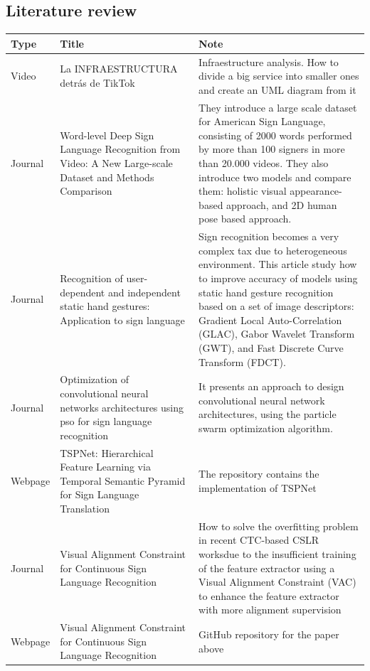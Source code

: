 \subsection{Literature review}
\begin{longtable}{|p{3cm}|p{4cm}|p{6cm}|}
    \hline {Type} & {Title} & {Note}      \\
    \hline Video & La INFRAESTRUCTURA detrás de TikTok \cite{TikTok2021} & Infraestructure analysis. How to divide a big service into smaller ones and create an UML diagram from it \\
    \hline Journal & Word-level Deep Sign Language Recognition from Video: A New Large-scale Dataset and Methods Comparison \cite{Li2019} & They introduce a large scale dataset for American Sign Language, consisting of 2000 words performed by more than 100 signers in more than 20.000 videos. They also introduce two models and compare them: holistic visual appearance-based approach, and 2D human pose based approach. \\
    \hline Journal & Recognition of user-dependent and independent static hand gestures: Application to sign language \cite{Sadeddine2021} & Sign recognition becomes a very complex tax due to heterogeneous environment. This article study how to improve accuracy of models using static hand gesture recognition based on a set of image descriptors: Gradient Local Auto-Correlation (GLAC), Gabor Wavelet Transform (GWT), and Fast Discrete Curve Transform (FDCT). \\
    \hline Journal & Optimization of convolutional neural networks architectures using pso for sign language recognition \cite{Fregoso2021} & It presents an approach to design convolutional neural network architectures, using the particle swarm optimization algorithm.\\
    \hline Webpage & TSPNet: Hierarchical Feature Learning via Temporal Semantic Pyramid for Sign Language Translation \cite{SLTTSPNet} & The repository contains the implementation of TSPNet \\
    \hline Journal & Visual Alignment Constraint for Continuous Sign Language Recognition \cite{Min2021} & How to solve the overfitting problem in recent CTC-based CSLR worksdue to the insufficient training of the feature extractor using a Visual Alignment Constraint (VAC) to enhance the feature extractor with more alignment supervision \\
    \hline Webpage & Visual Alignment Constraint for Continuous Sign Language Recognition \cite{Min2021} & GitHub repository for the paper above \\

\end{longtable}
